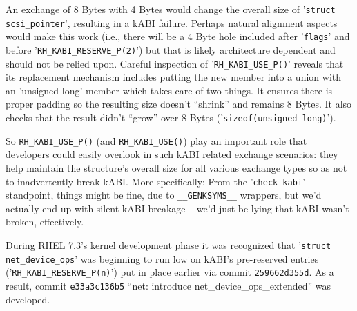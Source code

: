 \documentclass[10pt,oneside,english]{book}
\begin{document}
An exchange of 8 Bytes with 4 Bytes would change the overall size
of '\texttt{struct scsi\_pointer}', resulting in a kABI failure. Perhaps
natural alignment aspects would make this work (i.e., there will be
a 4 Byte hole included after '\texttt{flags}' and before '\texttt{RH\_KABI\_RESERVE\_P(2)}')
but that is likely architecture dependent and should not be relied
upon. Careful inspection of '\texttt{RH\_KABI\_USE\_P()}' reveals
that its replacement mechanism includes putting the new member into
a union with an 'unsigned long' member which takes care of two things.
It ensures there is proper padding so the resulting size doesn't ``shrink''
and remains 8 Bytes. It also checks that the result didn't ``grow''
over 8 Bytes ('\texttt{sizeof(unsigned long)}').

So \texttt{RH\_KABI\_USE\_P()} (and \texttt{RH\_KABI\_USE()}) play
an important role that developers could easily overlook in such kABI
related exchange scenarios: they help maintain the structure's overall
size for all various exchange types so as not to inadvertently break
kABI. More specifically: From the '\texttt{check-kabi}' standpoint,
things might be fine, due to \texttt{\_\_GENKSYMS\_\_} wrappers, but
we'd actually end up with silent kABI breakage -- we'd just be lying
that kABI wasn't broken, effectively.

During RHEL 7.3's kernel development phase it was recognized that
'\texttt{struct net\_device\_ops}' was beginning to run low on kABI's
pre-reserved entries ('\texttt{RH\_KABI\_RESERVE\_P(n)}') put in place
earlier via commit \texttt{259662d355d}. As a result, commit \texttt{e33a3c136b5}
``net: introduce net\_device\_ops\_extended'' was developed.
\end{document}

